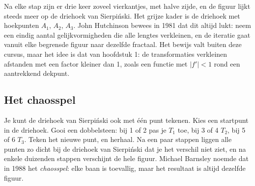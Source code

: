Na elke stap zijn er drie keer zoveel vierkantjes, met halve zijde, en de figuur lijkt steeds meer op de driehoek van Sierpiński. Het grijze kader is de driehoek met hoekpunten $A_1$, $A_2$, $A_3$. John Hutchinson bewees in 1981 dat dit altijd lukt: neem een eindig aantal gelijkvormigheden die alle lengtes verkleinen, en de iteratie gaat vanuit elke begrensde figuur naar dezelfde fractaal. Het bewijs valt buiten deze cursus, maar het idee is dat van hoofdstuk 1: de transformaties verkleinen afstanden met een factor kleiner dan 1, zoals een functie met $|f'| < 1$ rond een aantrekkend dekpunt.


\begin{oefeningen}
\end{oefeningen}

\subsection{Het chaosspel}

Je kunt de driehoek van Sierpiński ook met één punt tekenen. Kies een startpunt in de driehoek. Gooi een dobbelsteen: bij 1 of 2 pas je $T_1$ toe, bij 3 of 4 $T_2$, bij 5 of 6 $T_3$. Teken het nieuwe punt, en herhaal. Na een paar stappen liggen alle punten zo dicht bij de driehoek van Sierpiński dat je het verschil niet ziet, en na enkele duizenden stappen verschijnt de hele figuur. Michael Barnsley noemde dat in 1988 het \textit{chaosspel}: elke baan is toevallig, maar het resultaat is altijd dezelfde figuur.

